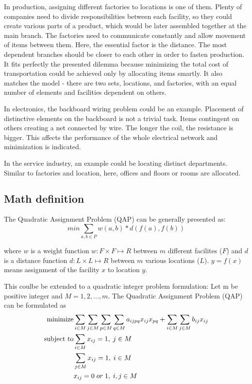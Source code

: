 In production, assigning different factories to locations is one of them.
Plenty of companies need to divide responsibilities between each facility, so they could create various parts of a product, which would be later assembled together at the main branch.
The factories need to communicate constantly and allow movement of items between them.
Here, the essential factor is the distance.
The most dependent branches should be closer to each other in order to fasten production.
It fits perfectly the presented dilemma because minimizing the total cost of transportation could be achieved only by allocating items smartly.
It also matches the model - there are two sets, locations, and factories, with an equal number of elements and facilities dependent on others.

In electronics, the backboard wiring problem could be an example.
Placement of distinctive elements on the backboard is not a trivial task.
Items contingent on others creating a net connected by wire.
The longer the coil, the resistance is bigger.
This affects the performance of the whole electrical network and minimization is indicated.

In the service industry, an example could be locating distinct departments.
Similar to factories and location, here, offices and floors or rooms are allocated.

\subsection{Math definition}
The Quadratic Assignment Problem (QAP) can be generally presented as:
\begin{equation}
min \sum_{a, b \in P } w(a, b) * d( f(a), f(b))
\end{equation}

where $w$ is a weight function $w: F \times F \mapsto R$ between $m$ different facilites ($F$) and $d$ is a distance function $d: L \times L \mapsto R$ between $m$ various locations ($L$). $y = f(x)$ means assignment of the facility $x$ to location $y$.

This coulbe be extended to a quadratic integer problem formulation:
Let m be positive integer and $M = { 1, 2, ..., m }$. The Quadratic Assignment Problem (QAP) can be formulated as
\begin{align}
  \text{minimize} &\null \sum_{i \in M} \sum_{j \in M} \sum_{p \in M} \sum_{q \in M} a_{ijpq}x_{ij}x_{pq} + \sum_{i \in M} \sum_{j \in M} b_{ij} x_{ij} \\
  \text{subject to} &\null \sum_{i \in M} x_{ij} = 1, \; j \in M \\
  &\null \sum_{j \in M} x_{ij} = 1, \; i \in M \\
  &\null x_{ij} = 0 \; or \; 1, \; i, j \in M
\end{align}

